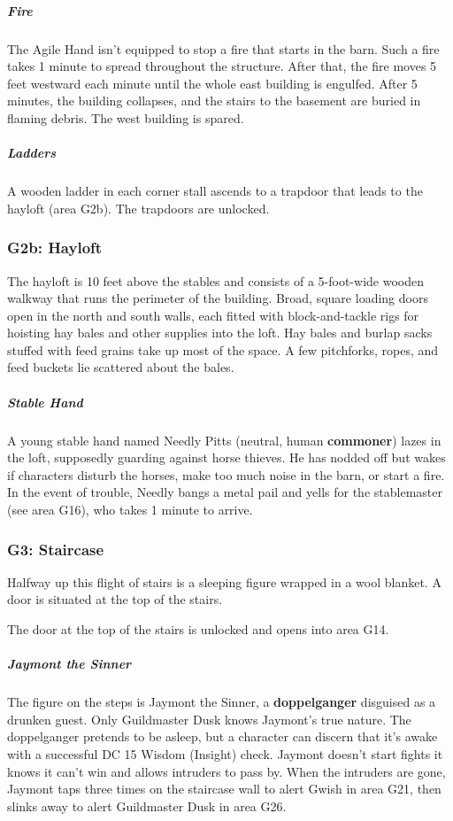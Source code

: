 \documentclass[10pt,a4paper,twoside,bg=print,twocolumn,openany,nodeprecatedcode]{dndbook}
\begin{document}
\subparagraph{Fire}
The Agile Hand isn't equipped to stop a fire that starts in the barn. Such a fire takes 1 minute to spread throughout the structure. After that, the fire moves 5 feet westward each minute until the whole east building is engulfed. After 5 minutes, the building collapses, and the stairs to the basement are buried in flaming debris. The west building is spared.

\subparagraph{Ladders}
A wooden ladder in each corner stall ascends to a trapdoor that leads to the hayloft (area G2b). The trapdoors are unlocked.

\subsubsection{G2b: Hayloft}
The hayloft is 10 feet above the stables and consists of a 5-foot-wide wooden walkway that runs the perimeter of the building. Broad, square loading doors open in the north and south walls, each fitted with block-and-tackle rigs for hoisting hay bales and other supplies into the loft. Hay bales and burlap sacks stuffed with feed grains take up most of the space. A few pitchforks, ropes, and feed buckets lie scattered about the bales.

\subparagraph{Stable Hand}
A young stable hand named Needly Pitts (neutral, human \textbf{commoner}) lazes in the loft, supposedly guarding against horse thieves. He has nodded off but wakes if characters disturb the horses, make too much noise in the barn, or start a fire. In the event of trouble, Needly bangs a metal pail and yells for the stablemaster (see area G16), who takes 1 minute to arrive.

\subsubsection{G3: Staircase}
\begin{DndReadAloud}{}
Halfway up this flight of stairs is a sleeping figure wrapped in a wool blanket. A door is situated at the top of the stairs.

\end{DndReadAloud}

The door at the top of the stairs is unlocked and opens into area G14.

\subparagraph{Jaymont the Sinner}
The figure on the steps is Jaymont the Sinner, a \textbf{doppelganger} disguised as a drunken guest. Only Guildmaster Dusk knows Jaymont's true nature. The doppelganger pretends to be asleep, but a character can discern that it's awake with a successful DC 15 Wisdom (Insight) check. Jaymont doesn't start fights it knows it can't win and allows intruders to pass by. When the intruders are gone, Jaymont taps three times on the staircase wall to alert Gwish in area G21, then slinks away to alert Guildmaster Dusk in area G26.
\end{document}
